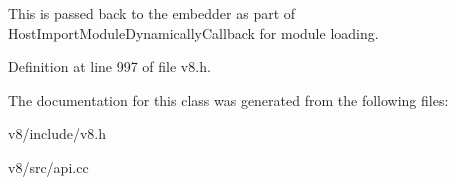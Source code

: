This is passed back to the embedder as part of Host\+Import\+Module\+Dynamically\+Callback for module loading. 

Definition at line 997 of file v8.\+h.



The documentation for this class was generated from the following files\+:\begin{DoxyCompactItemize}
\item 
v8/include/v8.\+h\item 
v8/src/api.\+cc\end{DoxyCompactItemize}
